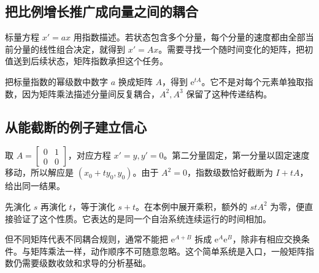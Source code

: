 \subsection*{把比例增长推广成向量之间的耦合}
标量方程 $x'=ax$ 用指数描述。若状态包含多个分量，每个分量的速度都由全部当前分量的线性组合决定，就得到 $x'=Ax$。需要寻找一个随时间变化的矩阵，把初值送到后续状态，矩阵指数承担这个任务。

把标量指数的幂级数中数字 $a$ 换成矩阵 $A$，得到 $\mathrm e^{tA}$。它不是对每个元素单独取指数，因为矩阵乘法描述分量间反复耦合，$A^2,A^3$ 保留了这种传递结构。

\subsection*{从能截断的例子建立信心}
取 $A=\left[\begin{smallmatrix}0&1\\0&0\end{smallmatrix}\right]$，对应方程 $x'=y,y'=0$。第二分量固定，第一分量以固定速度移动，所以解应是 $(x_0+ty_0,y_0)$。由于 $A^2=0$，指数级数恰好截断为 $I+tA$，给出同一结果。

先演化 $s$ 再演化 $t$，等于演化 $s+t$。在本例中展开乘积，额外的 $stA^2$ 为零，便直接验证了这个性质。它表达的是同一个自治系统连续运行的时间相加。

但不同矩阵代表不同耦合规则，通常不能把 $\mathrm e^{A+B}$ 拆成 $\mathrm e^A\mathrm e^B$，除非有相应交换条件。与矩阵乘法一样，动作顺序不可随意忽略。这个简单系统是入口，一般矩阵指数仍需要级数收敛和求导的分析基础。
